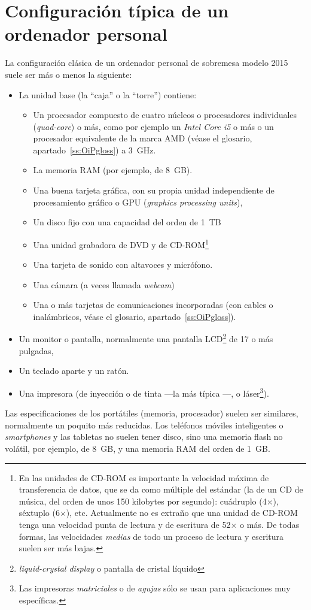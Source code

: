 \section{Configuración típica de un ordenador personal} La configuración clásica de un ordenador personal de sobremesa modelo 2015 suele ser más o menos la siguiente: \begin{itemize} \item La unidad base (la ``caja'' o la ``torre'') contiene: \begin{itemize} \item Un procesador compuesto de cuatro núcleos o procesadores individuales (\emph{quad-core}) o más, como por ejemplo un \emph{Intel Core i5} o más o un procesador equivalente de la marca AMD (véase el glosario, apartado~\ref{ss:OiPgloss}) a 3~GHz. \item La memoria RAM (por ejemplo, de 8~GB). \item Una buena tarjeta gráfica, con su propia unidad independiente de procesamiento gráfico o GPU (\emph{graphics processing units}), \item Un disco fijo con una capacidad del orden de 1~TB \item Una unidad grabadora de DVD y de CD-ROM\footnote{En las unidades de CD-ROM es importante la velocidad máxima de transferencia de datos, que se da como múltiple del estándar (la de un CD de música, del orden de unos 150 kilobytes por segundo): cuádruplo (4$\times$), séxtuplo (6$\times$), etc. Actualmente no es extraño que una unidad de CD-ROM tenga una velocidad punta de lectura y de escritura de 52$\times$ o más. De todas formas, las velocidades \emph{medias} de todo un proceso de lectura y escritura suelen ser más bajas.} \item Una tarjeta de sonido con altavoces y micrófono. \item Una cámara (a veces llamada \emph{webcam}) \item Una o más tarjetas de comunicaciones incorporadas (con cables o inalámbricos, véase el glosario, apartado~\ref{ss:OiPgloss}). \end{itemize} \item Un monitor o pantalla, normalmente una pantalla LCD\footnote{\emph{liquid-crystal display} o pantalla de cristal líquido} de 17 o más pulgadas, \item Un teclado aparte y un ratón. \item Una impresora (de inyección o de tinta ---la más típica ---, o láser\footnote{Las impresoras \emph{matriciales} o de \emph{agujas} sólo se usan para aplicaciones muy específicas.}). \end{itemize} Las especificaciones de los portátiles (memoria, procesador) suelen ser similares, normalmente un poquito más reducidas. Los teléfonos móviles inteligentes o \emph{smartphones} y las tabletas no suelen tener disco, sino una memoria flash no volátil, por ejemplo, de 8~GB, y una memoria RAM del orden de 1~GB. 

